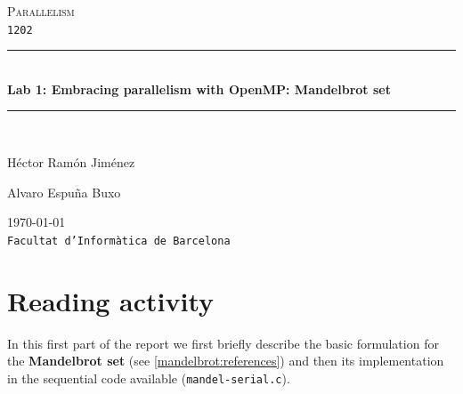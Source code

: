\documentclass[a4paper,11pt]{article}
\begin{document}
\begin{titlepage}
\begin{center}
\textsc{\Large Parallelism}
\\
\texttt{1202}
\\[1.5cm]
\rule{\linewidth}{0.5mm}
\\[0.4cm]
{\huge
\bfseries
Lab 1: Embracing parallelism with OpenMP: Mandelbrot set
\\[0.4cm]
}
\rule{\linewidth}{0.5mm}
\\[2.5cm]
\begin{minipage}{0.4\textwidth}
\begin{flushleft}
\large
Héctor Ramón Jiménez
\end{flushleft}
\end{minipage}
\begin{minipage}{0.4\textwidth}
\begin{flushright}
\large
Alvaro Espuña Buxo
\end{flushright}
\end{minipage}
\vfill
{\large
\today
}
\\
{\large
\texttt{Facultat d'Informàtica de Barcelona}
}
\end{center}
\end{titlepage}
\section{Reading activity}
In this first part of the report we first briefly describe the basic formulation for the \textbf{Mandelbrot set}
    (see \ref{mandelbrot:references}) and then its implementation in the sequential code available (\texttt{mandel-serial.c}).
\end{document}
